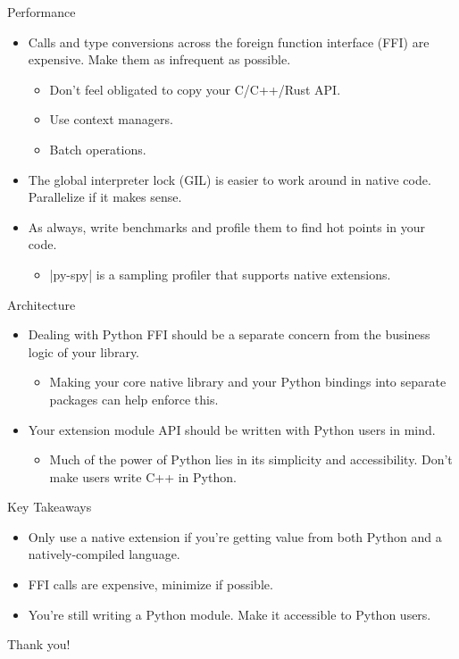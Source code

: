 \documentclass[8pt, aspectratio=169]{beamer}
\begin{document}
\begin{frame}{Performance}
\begin{itemize}
\item Calls and type conversions across the foreign function interface (FFI) are expensive. Make them as infrequent as possible.
\begin{itemize}
\item Don't feel obligated to copy your C/C++/Rust API.
\item Use context managers.
\item Batch operations.
\end{itemize}
\item The global interpreter lock (GIL) is easier to work around in native code. Parallelize if it makes sense.
\item As always, write benchmarks and profile them to find hot points in your code.
\begin{itemize}
\item \rustinline|py-spy| is a sampling profiler that supports native extensions.
\end{itemize}
\end{itemize}
\end{frame}

\begin{frame}{Architecture}
\begin{itemize}
\item Dealing with Python FFI should be a separate concern from the business logic of your library.
\begin{itemize}
\item Making your core native library and your Python bindings into separate packages can help enforce this.
\end{itemize}
\item Your extension module API should be written with Python users in mind.
\begin{itemize}
\item Much of the power of Python lies in its simplicity and accessibility. Don't make users write C++ in Python.
\end{itemize}
\end{itemize}
\end{frame}

\begin{frame}{Key Takeaways}
\begin{itemize}
\item Only use a native extension if you're getting value from both Python and a natively-compiled language.
\item FFI calls are expensive, minimize if possible.
\item You're still writing a Python module. Make it accessible to Python users.
\end{itemize}
\end{frame}

{
\begin{frame}[standout]
Thank you!
\end{frame}
}
\end{document}
